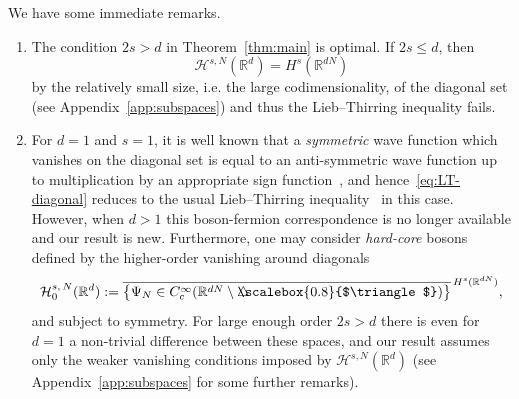 \documentclass[10pt]{amsart}
\theoremstyle{definition}\newtheorem{defi}[theo]{Definition}\newtheorem{rema}[theo]{Remark}\newtheorem{exam}[theo]{Example}\newtheorem{exem}[theo]{Example}\newtheorem{nota}[theo]{Notation}
\newcommand*\R {\mathbb{R}}
\newcommand\1{{\ensuremath {\mathds 1} }}
\newcommand{\cH}{\mathcal{H}}
\newcommand{\bDelta}{{\mbox{$\triangle$}\hspace{-8.6pt}\scalebox{0.8}{$\triangle$}}}
\begin{document}
We have some immediate remarks.
\begin{enumerate}
\item The condition $2s>d$ in Theorem~\ref{thm:main} is optimal. If $2s\le d$, then
\[
\cH^{s,N}(\R^d)=H^s(\R^{dN})
\]
by the relatively small size, i.e. the large codimensionality, of the diagonal set (see Appendix~\ref{app:subspaces}) and thus the Lieb--Thirring inequality fails.

\item For $d=1$ and $s=1$, it is well known that a \emph{symmetric} wave function which vanishes on the diagonal set is equal to an anti-symmetric wave function up to multiplication by an appropriate sign function~\cite{Girardeau-60}, and hence~\eqref{eq:LT-diagonal} reduces to the usual Lieb--Thirring inequality~\cite{LieThi-76} in this case. However, when $d>1$ this boson-fermion correspondence is no longer available and our result is new. Furthermore, one may consider \emph{hard-core} bosons defined by the higher-order vanishing around diagonals
\begin{equation}\label{eq:cH0}
\cH_0^{s,\,N}(\R^d):= \overline{\bigl\{ \Psi_N \in C_c^\infty(\R^{dN} \setminus \bDelta) \bigr\} }^{\, H^s(\R^{dN})},
\end{equation}
and subject to symmetry. For large enough order $2s>d$ there is even for\linebreak$d=1$ a non-trivial difference between these spaces, and our result assumes only the weaker vanishing conditions imposed by $\cH^{s,N}(\R^d)$ (see Appendix~\ref{app:subspaces} for some further remarks).


\end{enumerate}
\end{document}
